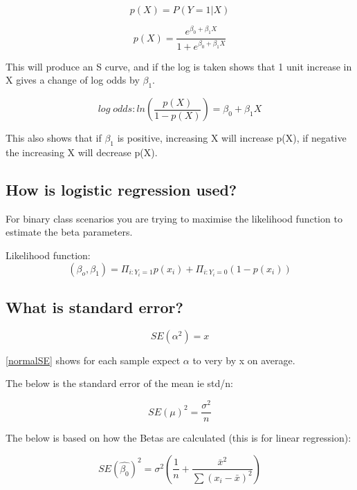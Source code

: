 \documentclass[11pt]{scrartcl} %
\begin{document}
\begin{equation}
	p(X) = P(Y=1|X)
\end{equation}

\begin{equation}
	p(X) = \frac{e^{\beta_0 + \beta_1X}}{1+e^{\beta_0 + \beta_1X}}
\end{equation}

This will produce an S curve, and if the log is taken shows that 1 unit increase in X gives a change of log odds by 
\( \beta_1\).

\begin{equation}
	log\; odds: ln(\frac{p(X)}{1-p(X)}) = \beta_0 + \beta_1X
\end{equation}

This also shows that if \(\beta_1\) is positive, increasing X will increase p(X), if negative the increasing X will
decrease p(X).

\subsection{How is logistic regression used?}

For binary class scenarios you are trying to maximise the likelihood function to estimate the beta parameters.

Likelihood function:
\begin{equation}
	(\beta_o,\beta_1) = \Pi_{i:Y_i=1}p(x_i) + \Pi_{i:Y_i=0}(1-p(x_i))
\end{equation}

\subsection{What is standard error?}

\begin{equation}
	SE(\alpha^2) = x
	\label{normalSE}
\end{equation}

\ref{normalSE} shows for each sample expect \(\alpha\) to very by x on average.

The below is the standard error of the mean ie std/n:

\begin{equation}
	SE(\mu)^2 = \frac{\sigma^2}{n}
\end{equation}

The below is based on how the Betas are calculated (this is for linear regression):

\begin{equation}
	SE(\hat{\beta_0})^2 = \sigma^2(\frac{1}{n} + \frac{\bar{x}^2}{\sum{(x_i-\bar{x})^2}})
\end{equation}
\end{document}
